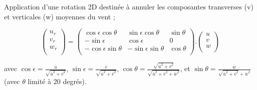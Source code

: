 Application d'une rotation 2D destin\'ee \`a annuler
les composantes transverses (v) et verticales (w) moyennes du vent ;
  
\[
  \left(
\begin{array}{c}
u_r \\ v_r \\ w_r \\
\end{array}
  \right)
=
  \left(
\begin{array}{ccc}
\cos\epsilon \cos\theta & \sin\epsilon \cos\theta & \sin\theta \\
-\sin\epsilon & \cos\epsilon & 0 \\
-\cos\epsilon \sin\theta & -\sin\epsilon \sin\theta & \cos\theta \\
\end{array}
  \right)
.
  \left(
\begin{array}{c}
u \\ v \\ w \\
\end{array}
  \right)
\]

avec $\cos\epsilon=\frac{\overline{u}}{\sqrt{\overline{u}^2+\overline{v}^2}}$,
    $\sin\epsilon=\frac{\overline{v}}{\sqrt{\overline{u}^2+\overline{v}^2}}$,
    $\cos\theta=\frac{\sqrt{\overline{u}^2+\overline{v}^2}}
                     {\sqrt{\overline{u}^2+\overline{v}^2+\overline{w}^2}}$,
et  $\sin\theta=\frac{\overline{w}}
                     {\sqrt{\overline{u}^2+\overline{v}^2}+\overline{w}^2}$ 
(avec $\theta$ limit\'e \`a 20 degr\'es).

